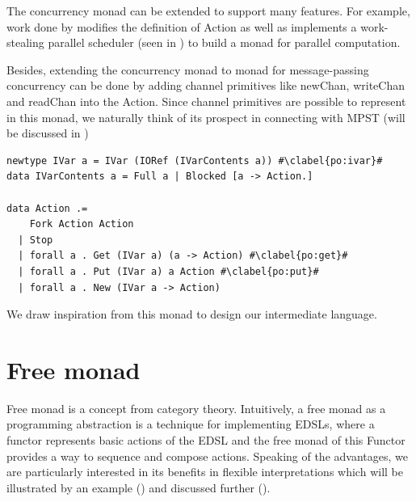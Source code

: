 The concurrency monad can be extended to support many features. For example, work done by \cite{marlowMonadDeterministicParallelism2011} modifies the definition of Action as well as implements a work-stealing parallel scheduler (seen in ) to build a monad for parallel computation. 

Besides, extending the concurrency monad to monad for message-passing concurrency can be done by adding channel primitives like newChan, writeChan and readChan into the Action. Since channel primitives are possible to represent in this monad, we naturally think of its prospect in connecting with MPST (will be discussed in )
\begin{listing}[ht]
  \begin{verbatim}
newtype IVar a = IVar (IORef (IVarContents a)) #\clabel{po:ivar}#
data IVarContents a = Full a | Blocked [a -> Action.]
    
data Action .=
    Fork Action Action
  | Stop
  | forall a . Get (IVar a) (a -> Action) #\clabel{po:get}#
  | forall a . Put (IVar a) a Action #\clabel{po:put}#
  | forall a . New (IVar a -> Action)
  \end{verbatim}
  \label{b:mo:c3}
\end{listing}

We draw inspiration from this monad to design our intermediate language.
\section{Free monad} \label{b:fm}
Free monad \cite{FreeMonadNLab} is a concept from category theory. Intuitively, a free monad as a programming abstraction is a technique for implementing EDSLs, where a functor represents basic actions of the EDSL and the free monad of this Functor provides a way to sequence and compose actions. Speaking of the advantages, we are particularly interested in its benefits in flexible interpretations which will be illustrated by an example () and discussed further ().
